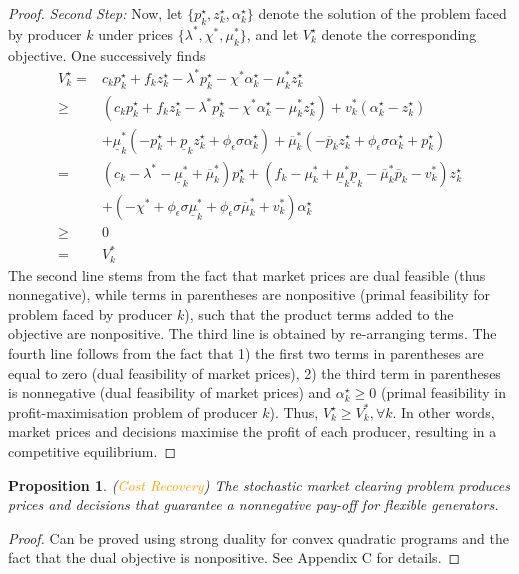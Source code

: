 \documentclass{article}
\newtheorem{proposition}{Proposition}
\begin{document}
\begin{proof}
\textit{Second Step:} Now, let $\{p_k^\star, z_k^\star, \alpha_k^\star\}$ denote the solution of the problem faced by producer $k$ under prices $\{\lambda^*, \chi^*, \mu_k^*\}$, and let $V_k^\star$ denote the corresponding objective. One successively finds
\begin{align}
    V_k^\star =& c_k p_k^\star + f_k z_k^\star - \lambda^* p_k^\star - \chi^* \alpha_k^\star - \mu_k^*z_k^\star\\
    \ge& (c_k p_k^\star + f_k z_k^\star - \lambda^* p_k^\star - \chi^* \alpha_k^\star - \mu_k^*z_k^\star) + v_k^*(\alpha_k^\star - z_k^\star)\\
    &+ \underline{\mu}_k^*(-p_k^\star  + \underline{p}_k z_k^\star + \phi_{\epsilon} \sigma \alpha_k^\star) + \overline{\mu}_k^* (-\overline{p}_k z_k^\star + \phi_{\epsilon} \sigma \alpha_k^\star + p_k^\star)\\
    =& (c_k - \lambda^* - \underline{\mu}_k^* + \overline{\mu}_k^*) p_k^\star+(f_k - \mu_k^* + \underline{\mu}_k^* \underline{p}_k - \overline{\mu}_k^* \overline{p}_k - v_k^*) z_k^\star\\
    &+ (-\chi^* + \phi_{\epsilon} \sigma \underline{\mu}_k^* + \phi_{\epsilon} \sigma \overline{\mu}_k^* + v_k^*) \alpha_k^\star\\
    \ge& 0\\
    =& V_k^*
\end{align}
The second line stems from the fact that market prices are dual feasible (thus nonnegative), while terms in parentheses are nonpositive (primal feasibility for problem faced by producer $k$), such that the product terms added to the objective are nonpositive. The third line is obtained by re-arranging terms. The fourth line follows from the fact that 1) the first two terms in parentheses are equal to zero (dual feasibility of market prices), 2) the third term in parentheses is nonnegative (dual feasibility of market prices) and $\alpha_k^\star \ge 0$ (primal feasibility in profit-maximisation problem of producer $k$). Thus, $V_k^\star \ge V_k^*, \forall k$. In other words, market prices and decisions maximise the profit of each producer, resulting in a competitive equilibrium.
\end{proof}

\begin{proposition}
(\textcolor{orange}{Cost Recovery}) The stochastic market clearing problem produces prices and decisions that guarantee a nonnegative pay-off for flexible generators.
\end{proposition}
\begin{proof}
Can be proved using strong duality for convex quadratic programs and the fact that the dual objective is nonpositive. See Appendix C for details.
\end{proof}
\end{document}
